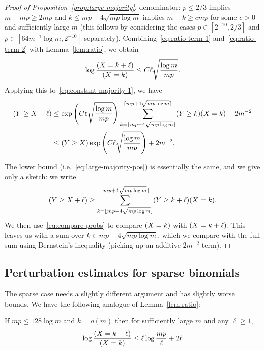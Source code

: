 \documentclass[EJP]{ejpecp}
\newcommand{\1}[1]{\mathbbm{1}_{\{#1\}}}
\let\Pr\relax
\DeclareMathOperator{\Pr}{Pr}
\begin{document}
\begin{proof}[Proof of Proposition~\ref{prop:large-majority}]
 denominator: $p \le 2/3$ implies
 $m - mp \ge 2mp$ and $k \le mp + 4 \sqrt{mp \log m}$ implies
 $m - k \ge cmp$  for some $c > 0$ and sufficiently large $m$
 (this follows by considering the cases $p \in [2^{-10}, 2/3]$ and
 $p \in [64 m^{-1} \log m, 2^{-10}]$ separately).
 Combining~\eqref{eq:ratio-term-1} and~\eqref{eq:ratio-term-2}
 with Lemma~\ref{lem:ratio}, we obtain
 \begin{equation}\label{eq:compare-probs}
  \log \frac{\Pr(X = k+\ell)}{\Pr(X = k)}
  \le C \ell \sqrt{\frac{\log m}{mp}}.
 \end{equation}
 Applying this to~\eqref{eq:constant-majority-1}, we have
 \begin{align*}
  \Pr(Y \ge X - \ell)
  &\le \exp\left(C \ell \sqrt{\frac{\log m}{mp}} \right)
      \sum_{k=\lfloor mp - 4 \sqrt{mp \log m}\rfloor}
	  ^{\lceil mp + 4 \sqrt{mp \log m}\rceil}
	  \Pr(Y \ge k) \Pr(X = k) + 2m^{-2} \\
  &\le \Pr(Y \ge X) \exp\left(C \ell \sqrt{\frac{\log m}{mp}}\right) + 2m^{-2}.
 \end{align*}

 The lower bound (i.e.~\eqref{eq:large-majority-pos})
 is essentially the same, and we give only a sketch: we write
 \begin{align*}
   \Pr(Y \ge X + \ell) \ge \sum_{k=\lfloor mp - 4 \sqrt{mp \log m}\rfloor}^{\lceil mp + 4 \sqrt{mp \log m}\rceil}
   \Pr(Y \ge k + \ell) \Pr(X = k).
 \end{align*}
 We then use~\eqref{eq:compare-probs} to compare $\Pr(X = k)$ with
 $\Pr(X = k + \ell)$. This leaves us with a sum over $k \in mp \pm 4 \sqrt{mp \log m}$,
 which we compare with the full sum using Bernstein's inequality (picking up
 an additive $2m^{-2}$ term).
\end{proof}


\subsection{Perturbation estimates for sparse binomials}

The sparse case needs a slightly different argument and
has slightly worse bounds. We have the following analogue
of Lemma~\ref{lem:ratio}:

\begin{lemma}\label{lem:ratio-sparse}
 If $mp \le 128 \log m$ and $k = o(m)$ then for sufficiently large $m$ and any $\ell \ge 1$,
 \[
  \log \frac {\Pr(X = k + \ell)}{\Pr(X = k)}
  \le \ell \log \frac{mp}{\ell} + 2\ell
 \]
\end{lemma}
\end{document}
